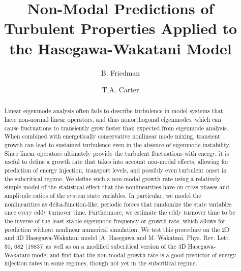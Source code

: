 \documentclass[twocolumn,showkeys,superscriptaddress]{revtex4}
\begin{document}
\title{Non-Modal Predictions of Turbulent Properties Applied to the Hasegawa-Wakatani Model}

\author{B. Friedman}



\author{T.A. Carter}




\begin{abstract}
Linear eigenmode analysis often fails to describe turbulence in model
systems that have non-normal linear operators, and thus
nonorthogonal eigenmodes, which can cause fluctuations to transiently grow faster than expected from eigenmode analysis. When combined with energetically conservative nonlinear mode mixing, 
transient growth can lead to sustained turbulence even in the absence of eigenmode instability. 
Since linear operators ultimately provide the turbulent fluctuations with energy, it is useful to define a growth rate that takes into account non-modal effects, allowing for
prediction of energy injection, transport levels, and possibly even turbulent onset in the subcritical regime. 
We define such a non-modal growth rate using a relatively simple model
of the statistical effect that the nonlinearities have on cross-phases and amplitude ratios of the system state variables. 
In particular, we model the nonlinearities as delta-function-like, periodic forces that randomize the state variables once every eddy turnover time. Furthermore, we estimate the eddy turnover
time to be the inverse of the least stable eigenmode frequency or growth rate, which allows for prediction without nonlinear numerical simulation. We test this procedure on the 2D and 3D Hasegawa-Wakatani model
[A. Hasegawa and M. Wakatani, Phys. Rev. Lett. 50, 682 (1983)] as well as on a modified subcritical version of the 3D Hasegawa-Wakatani model and find that
the non-modal growth rate is a good predictor of energy injection rates in some regimes, though not yet in the subcritical regime.
\end{abstract}

\maketitle
\end{document}
